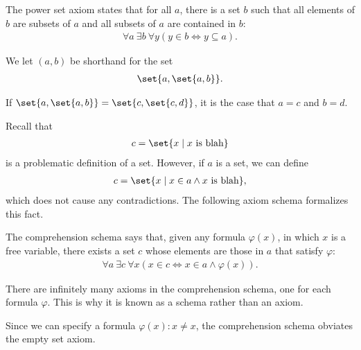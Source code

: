 \documentclass[10pt]{mypackage}
\begin{document}
\begin{axiom}
  The power set axiom states that for all $a$, there is a set $b$ such that all elements of $b$ are subsets of $a$ and all subsets of $a$ are contained in $b$:
  \begin{align*}
    \forall a\:\exists b\:\forall y\left(y\in b \Leftrightarrow y\subseteq a\right).
  \end{align*}
\end{axiom}
\begin{definition}
  We let $(a,b)$ be shorthand for the set
  \begin{align*}
    \set{a,\set{a,b}}.
  \end{align*}
\end{definition}
\begin{exercise}
  If $\set{a,\set{a,b}} = \set{c,\set{c,d}}$, it is the case that $a=c$ and $b = d$.
\end{exercise}
Recall that
\begin{align*}
  c = \set{x\mid x\text{ is blah}}
\end{align*}
is a problematic definition of a set. However, if $a$ is a set, we can define
\begin{align*}
  c = \set{x\mid x\in a \wedge x\text{ is blah}},
\end{align*}
which does not cause any contradictions. The following axiom schema formalizes this fact.
\begin{axiom}
  The comprehension schema says that, given any formula $\varphi(x)$, in which $x$ is a free variable, there exists a set $c$ whose elements are those in $a$ that satisfy $\varphi$:
  \begin{align*}
    \forall a\:\exists c\:\forall x\left(x\in c\Leftrightarrow x\in a\wedge \varphi(x)\right).
  \end{align*}
\end{axiom}
\begin{remark}
  There are infinitely many axioms in the comprehension schema, one for each formula $\varphi$. This is why it is known as a schema rather than an axiom.
\end{remark}
\begin{remark}
  Since we can specify a formula $\varphi(x): x\neq x$, the comprehension schema obviates the empty set axiom.
\end{remark}
\end{document}
